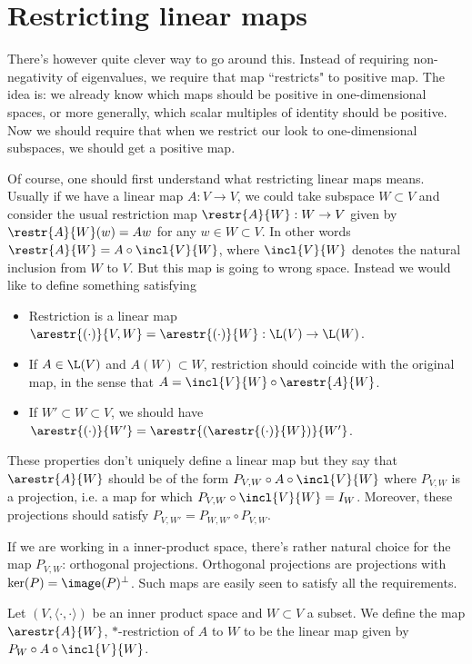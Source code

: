 \section{Restricting linear maps}

There's however quite clever way to go around this. Instead of requiring non-negativity of eigenvalues, we require that map ``restricts" to positive map. The idea is: we already know which maps should be positive in one-dimensional spaces, or more generally, which scalar multiples of identity should be positive. Now we should require that when we restrict our look to one-dimensional subspaces, we should get a positive map.

Of course, one should first understand what restricting linear maps means. Usually if we have a linear map $A : V \to V$, we could take subspace $W \subset V$ and consider the usual restriction map $\restr{A}{W} : W \to V$ given by $\restr{A}{W}(w) = Aw$ for any $w \in W \subset V$. In other words $\restr{A}{W} = A \circ \incl{V}{W}$, where $\incl{V}{W}$ denotes the natural inclusion from $W$ to $V$. But this map is going to wrong space. Instead we would like to define something satisfying
\begin{itemize}
	\item Restriction is a linear map $\arestr{(\cdot)}{V, W} = \arestr{(\cdot)}{W} : \L(V) \to \L(W)$.
	\item If $A \in \L(V)$ and $A(W) \subset W$, restriction should coincide with the original map, in the sense that $A = \incl{V}{W} \circ \arestr{A}{W}$.
	\item If $W' \subset W \subset V$, we should have $\arestr{(\cdot)}{W'} = \arestr{(\arestr{(\cdot)}{W})}{W'}$.
\end{itemize}

These properties don't uniquely define a linear map but they say that $\arestr{A}{W}$ should be of the form $P_{V, W} \circ A \circ \incl{V}{W}$ where $P_{V, W}$ is a projection, i.e. a map for which $P_{V, W} \circ \incl{V}{W} = I_{W}$. Moreover, these projections should satisfy $P_{V, W'} = P_{W, W'} \circ P_{V, W}$.

If we are working in a inner-product space, there's rather natural choice for the map $P_{V, W}$: orthogonal projections. Orthogonal projections are projections with $\ker(P) = \image(P)^{\perp}$. Such maps are easily seen to satisfy all the requirements.

\begin{maar}
	Let $(V, \langle \cdot, \cdot \rangle )$ be an inner product space and $W \subset V$ a subset. We define the map $\arestr{A}{W}$, $*$-restriction of $A$ to $W$ to be the linear map given by $P_{W} \circ A \circ \incl{V}{W}$.
\end{maar}


